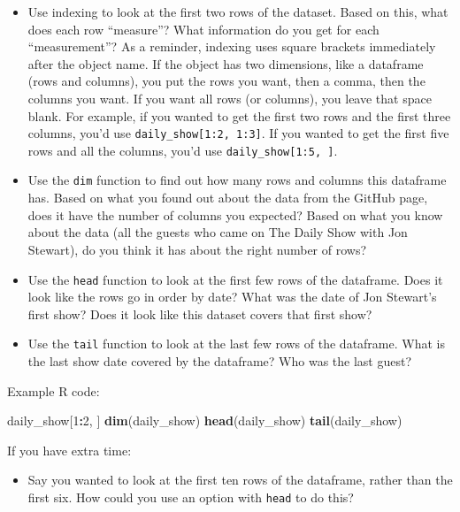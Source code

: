 \documentclass[]{book}
\makeatletter
\newenvironment{Shaded}{\begin{snugshade}}{\end{snugshade}}
\newcommand{\KeywordTok}[1]{\textcolor[rgb]{0.13,0.29,0.53}{\textbf{#1}}}
\newcommand{\DecValTok}[1]{\textcolor[rgb]{0.00,0.00,0.81}{#1}}
\newcommand{\OperatorTok}[1]{\textcolor[rgb]{0.81,0.36,0.00}{\textbf{#1}}}
\newcommand{\NormalTok}[1]{#1}
\providecommand{\tightlist}{%
  \setlength{\itemsep}{0pt}\setlength{\parskip}{0pt}}
\newenvironment{kframe}{%
\medskip{}
\setlength{\fboxsep}{.8em}
 \def\at@end@of@kframe{}%
 \ifinner\ifhmode%
  \def\at@end@of@kframe{\end{minipage}}%
  \begin{minipage}{\columnwidth}%
 \fi\fi%
 \def\FrameCommand##1{\hskip\@totalleftmargin \hskip-\fboxsep
 \colorbox{shadecolor}{##1}\hskip-\fboxsep
     \hskip-\linewidth \hskip-\@totalleftmargin \hskip\columnwidth}%
 \MakeFramed {\advance\hsize-\width
   \@totalleftmargin\z@ \linewidth\hsize
   \@setminipage}}%
 {\par\unskip\endMakeFramed%
 \at@end@of@kframe}
\renewenvironment{Shaded}{\begin{kframe}}{\end{kframe}}
\theoremstyle{definition}
\theoremstyle{definition}
\theoremstyle{definition}
\theoremstyle{remark}
\makeatother
\begin{document}
\begin{itemize}
\tightlist
\item
  Use indexing to look at the first two rows of the dataset. Based on
  this, what does each row ``measure''? What information do you get for
  each ``measurement''? As a reminder, indexing uses square brackets
  immediately after the object name. If the object has two dimensions,
  like a dataframe (rows and columns), you put the rows you want, then a
  comma, then the columns you want. If you want all rows (or columns),
  you leave that space blank. For example, if you wanted to get the
  first two rows and the first three columns, you'd use
  \texttt{daily\_show{[}1:2,\ 1:3{]}}. If you wanted to get the first
  five rows and all the columns, you'd use
  \texttt{daily\_show{[}1:5,\ {]}}.
\item
  Use the \texttt{dim} function to find out how many rows and columns
  this dataframe has. Based on what you found out about the data from
  the GitHub page, does it have the number of columns you expected?
  Based on what you know about the data (all the guests who came on The
  Daily Show with Jon Stewart), do you think it has about the right
  number of rows?
\item
  Use the \texttt{head} function to look at the first few rows of the
  dataframe. Does it look like the rows go in order by date? What was
  the date of Jon Stewart's first show? Does it look like this dataset
  covers that first show?
\item
  Use the \texttt{tail} function to look at the last few rows of the
  dataframe. What is the last show date covered by the dataframe? Who
  was the last guest?
\end{itemize}

Example R code:

\begin{Shaded}
\begin{Highlighting}[]
\NormalTok{daily_show[}\DecValTok{1}\OperatorTok{:}\DecValTok{2}\NormalTok{, ]}
\KeywordTok{dim}\NormalTok{(daily_show)}
\KeywordTok{head}\NormalTok{(daily_show)}
\KeywordTok{tail}\NormalTok{(daily_show)}
\end{Highlighting}
\end{Shaded}

If you have extra time:

\begin{itemize}
\tightlist
\item
  Say you wanted to look at the first ten rows of the dataframe, rather
  than the first six. How could you use an option with \texttt{head} to
  do this?
\end{itemize}
\end{document}
